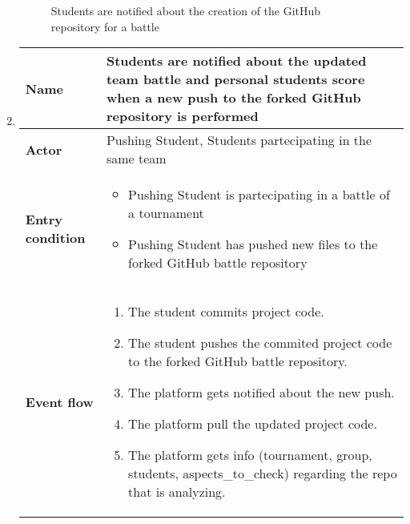 \begin{enumerate}[label=\textbf{UC\arabic*}:,leftmargin=1.3cm]
            \begin{figure}[H]
                  \centering
                  \caption{Students are notified about the creation of the GitHub repository for a battle}
                  \label{fig:Students are notified about the creation of the GitHub repository for a battle}
            \end{figure}
            \pagebreak
      \item \textbf{}
            \begin{table}[H]
                  \centering
                  \begin{tabular}{|l|p{11.9cm}|}
                        \hline 
                        \textbf{Name}            & Students are notified about the updated team battle and personal students score when a new push to the forked GitHub repository is performed                \\\hline
                        \textbf{Actor}           & Pushing Student, Students partecipating in the same team                                                                                \\\hline
                        \textbf{Entry condition} &
                        \begin{itemize}
                              \item Pushing Student is partecipating in a battle of a tournament
                              \item Pushing Student has pushed new files to the forked GitHub battle repository
                        \end{itemize}                                                  \\\hline
                        \textbf{Event flow}      &
                        \begin{enumerate}[label=\arabic*.]
                              \item The student commits project code.
                              \item The student pushes the commited project code to the forked GitHub battle repository.
                              \item The platform gets notified about the new push.
                              \item The platform pull the updated project code.
                              \item The platform gets info (tournament, group, students, aspects_to_check) regarding the repo that is analyzing.

\end{enumerate}
\end{tabular}
\end{table}
\end{enumerate}
